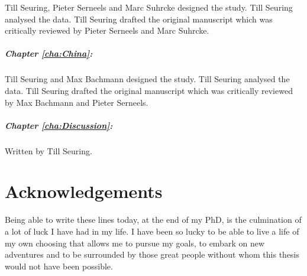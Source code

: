 Till Seuring, Pieter Serneels and Marc Suhrcke designed the study. Till Seuring analysed the data. Till Seuring drafted the original manuscript which was critically reviewed by Pieter Serneels and Marc Suhrcke.



\paragraph{Chapter \ref{cha:China}:} Till Seuring and Max Bachmann designed the study. Till Seuring analysed the data. Till Seuring drafted the original manuscript which was critically reviewed by Max Bachmann and Pieter Serneels.

\paragraph{Chapter \ref{cha:Discussion}:} Written by Till Seuring.
\cleardoublepage

\chapter*{\label{acknowledgements}Acknowledgements}

Being able to write these lines today, at the end of my PhD, is the culmination of a lot of luck I have had in my life. I have been so lucky to be able to live a life of my own choosing that allows me to pursue my goals, to embark on new adventures and to be surrounded by those great people without whom this thesis would not have been possible. 

